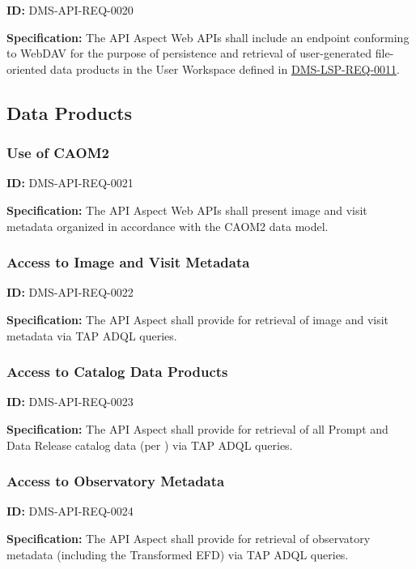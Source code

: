 \documentclass[SE,toc,lsstdraft]{lsstdoc}
\begin{document}
\label{DMS-API-REQ-0020}
\textbf{ID:} DMS-API-REQ-0020

\textbf{Specification:}
The API Aspect Web APIs shall include an endpoint conforming to WebDAV for the purpose of persistence and retrieval of user-generated file-oriented data products in the User Workspace defined in \hyperref[DMS-LSP-REQ-0011]{DMS-LSP-REQ-0011}.

\subsection{Data Products}

\subsubsection{Use of CAOM2}

\label{DMS-API-REQ-0021}
\textbf{ID:} DMS-API-REQ-0021

\textbf{Specification:}
The API Aspect Web APIs shall present image and visit metadata organized in accordance with the CAOM2 data model.

\subsubsection{Access to Image and Visit Metadata}

\label{DMS-API-REQ-0022}
\textbf{ID:} DMS-API-REQ-0022

\textbf{Specification:}
The API Aspect shall provide for retrieval of image and visit metadata via TAP ADQL queries.

\subsubsection{Access to Catalog Data Products}

\label{DMS-API-REQ-0023}
\textbf{ID:} DMS-API-REQ-0023

\textbf{Specification:}
The API Aspect shall provide for retrieval of all Prompt and Data Release catalog data (per ) via TAP ADQL queries.

\subsubsection{Access to Observatory Metadata}

\label{DMS-API-REQ-0024}
\textbf{ID:} DMS-API-REQ-0024

\textbf{Specification:}
The API Aspect shall provide for retrieval of observatory metadata (including the Transformed EFD) via TAP ADQL queries.
\end{document}
